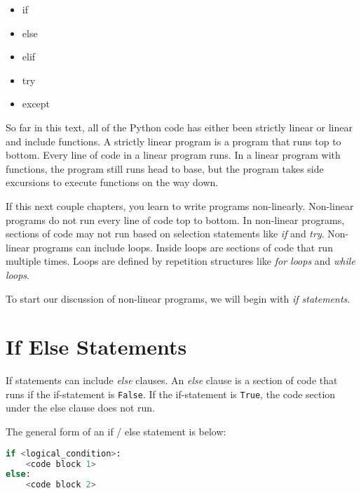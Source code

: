 \documentclass{book}
\providecommand{\tightlist}{%
      \setlength{\itemsep}{0pt}\setlength{\parskip}{0pt}}
\newcommand{\passthrough}[1]{#1}
\begin{document}
\begin{itemize}
\tightlist
\item
  if
\item
  else
\item
  elif
\item
  try
\item
  except
\end{itemize}
    




    
        So far in this text, all of the Python code has either been strictly
linear or linear and include functions. A strictly linear program is a
program that runs top to bottom. Every line of code in a linear program
runs. In a linear program with functions, the program still runs head to
base, but the program takes side excursions to execute functions on the
way down.

If this next couple chapters, you learn to write programs non-linearly.
Non-linear programs do not run every line of code top to bottom. In
non-linear programs, sections of code may not run based on selection
statements like \emph{if} and \emph{try}. Non-linear programs can
include loops. Inside loops are sections of code that run multiple
times. Loops are defined by repetition structures like \emph{for loops}
and \emph{while loops}.

To start our discussion of non-linear programs, we will begin with
\emph{if statements}.
    




    
        \hypertarget{if-else-statements}{%
\section{If Else Statements}\label{if-else-statements}}
    




    
        If statements can include \emph{else} clauses. An \emph{else} clause is
a section of code that runs if the if-statement is
\passthrough{\lstinline!False!}. If the if-statement is
\passthrough{\lstinline!True!}, the code section under the else clause
does not run.

The general form of an if / else statement is below:

\begin{lstlisting}[language=Python]
if <logical_condition>:
    <code block 1>
else:
    <code block 2>
\end{lstlisting}
\end{document}
